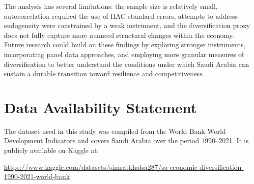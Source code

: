 \documentclass[12pt, a4paper]{article}
\begin{document}
The analysis has several limitations: the sample size is relatively small, autocorrelation required the use of HAC standard errors, attempts to address endogeneity were constrained by a weak instrument, and the diversification proxy does not fully capture more nuanced structural changes within the economy. Future research could build on these findings by exploring stronger instruments, incorporating panel data approaches, and employing more granular measures of diversification to better understand the conditions under which Saudi Arabia can sustain a durable transition toward resilience and competitiveness.

\section*{Data Availability Statement}

The dataset used in this study was compiled from the World Bank World Development Indicators and covers Saudi Arabia over the period 1990--2021. It is publicly available on Kaggle at:

\begin{center}
\url{https://www.kaggle.com/datasets/simratkhalsa287/sa-economic-diversification-1990-2021-world-bank}
\end{center}

\newpage

\end{document}
